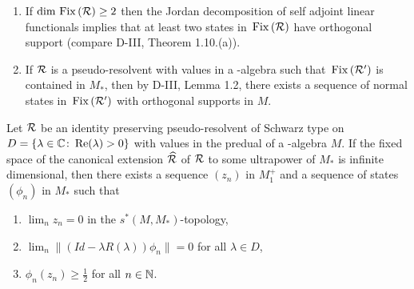 \begin{remark}\label{rem:d4-4.2}
\begin{enumerate}
\item
If $ \dim \mathop{}\mathrm{Fix}\left(\mathcal{R}\right) \geq 2 $  then the Jordan decomposition of self adjoint linear functionals implies that at least two states in $ \mathop{}\mathrm{Fix}\left(\mathcal{R}\right) $  have orthogonal support (compare D-III, Theorem 1.10.(a)).

\item
If $ \mathcal{R} $  is a pseudo-resolvent with values in a \WA-algebra such that $ \mathop{}\mathrm{Fix}\left(\mathcal{R}'\right) $  is contained in $ M_{*} $,  then by D-III, Lemma 1.2, there exists a sequence of normal states in $ \mathop{}\mathrm{Fix}\left(\mathcal{R}'\right) $  with orthogonal supports in $ M $.
\end{enumerate}
\end{remark}
\begin{lemma}\label{lem:d4-4.3}
Let $ \mathcal{R} $  be an identity preserving pseudo-resolvent of Schwarz type on $ D = \{\lambda \in \mathbb{C} \colon  \mathop{}\!\mathrm{Re}(\lambda) > 0\} $  with values in the predual of a \WA-algebra $ M $.
If the fixed space of the canonical extension $ \widehat{\mathcal{R}} $  of $ \mathcal{R} $  to some ultrapower of $ M_{*} $  is infinite dimensional, then there exists a sequence $ (z_{n}) $  in $ M_{1}^{+} $  and a sequence of states $ (\phi_{n}) $  in $ M_{*} $  such that
\begin{enumerate}[\upshape (i)]

\item\label{item:d4-4.3-i}
$ \lim_{n} z_{n} = 0 $  in the $ s^{*}(M,M_{*}) $-topology,

\item\label{item:d4-4.3-ii}
$ \lim_{n} \|(Id - \lambda R(\lambda))\phi_{n}\| = 0 $  for all $ \lambda \in D $,

\item\label{item:d4-4.3-iii}
$ \phi_{n}(z_{n}) \geq \frac{1}{2} $  for all $ n \in \mathbb{N} $. 
\end{enumerate}
\end{lemma}
